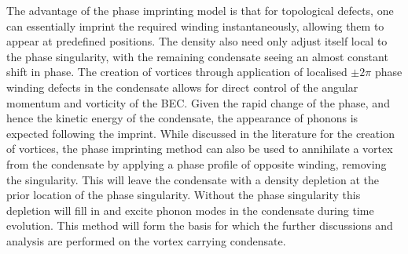 The advantage of the phase imprinting model is that for topological defects, one can essentially imprint the required winding instantaneously, allowing them to appear at predefined positions. The density also need only adjust itself local to the phase singularity, with the remaining condensate seeing an almost constant shift in phase. The creation of vortices through application of localised $\pm 2\pi$ phase winding defects in the condensate allows for direct control of the angular momentum and vorticity of the BEC. Given the rapid change of the phase, and hence the kinetic energy of the condensate, the appearance of phonons is expected following the imprint. While discussed in the literature for the creation of vortices, the phase imprinting method can also be used to annihilate a vortex from the condensate by applying a phase profile of opposite winding, removing the singularity. This will leave the condensate with a density depletion at the prior location of the phase singularity. Without the phase singularity this depletion will fill in and excite phonon modes in the condensate during time evolution. This method will form the basis for which the further discussions and analysis are performed on the vortex carrying condensate.

